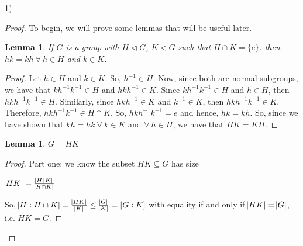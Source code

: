 \documentclass[executivepaper]{article}
\newtheorem{lemma}[theorem]{Lemma}
\begin{document}
\begin{flushleft}

1)

\begin{proof}

To begin, we will prove some lemmas that will be useful later.

\begin{lemma}

If $G$ is a group with $H \triangleleft G$, $K \triangleleft G$ such that $H \cap K=\{e\}$. then $hk=kh ~ \forall ~ h \in H$ and $k \in K$.

\end{lemma}

\vspace{3mm}

\begin{proof}

Let $h \in H$ and $k \in K$. So, $h^{-1} \in H$. Now, since both are normal subgroups, we have that $kh^{-1}k^{-1} \in H$ and $hkh^{-1} \in K$. Since $kh^{-1}k^{-1} \in H$ and $h \in H$, then $hkh^{-1}k^{-1} \in H$. Similarly,  since $hkh^{-1} \in K$ and $k^{-1} \in K$, then $hkh^{-1}k^{-1} \in K$. Therefore, $hkh^{-1}k^{-1} \in H \cap K$. So, $hkh^{-1}k^{-1}=e$ and hence, $hk=kh$. So, since we have shown that $kh=hk ~ \forall ~ k \in K$ and $\forall ~ h \in H$, we have that $HK=KH$.

\end{proof}

\vspace{5mm}

\begin{lemma}

$G=HK$

\end{lemma}

\vspace{3mm}

\begin{proof}

Part one: we know the subset $HK \subseteq G$ has size

\begin{center}

$\abs{HK}=\frac{\abs{H}\abs{K}}{\abs{H \cap K}}$

\end{center} 

So, $\abs{H : H \cap K}=\frac{\abs{HK}}{\abs{K}} \leq \frac{\abs{G}}{\abs{K}}=[G : K]$ with equality if and only if $\abs{HK}=\abs{G}$, i.e. $HK=G$.


\end{proof}
\end{proof}
\end{flushleft}
\end{document}
